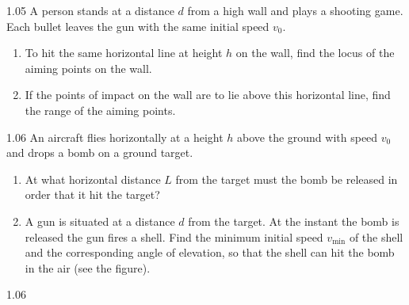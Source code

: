 \begin{problem}{1.05}
A person stands at a distance $d$ from a high wall and plays a shooting game. Each bullet leaves the gun with the same initial speed $v_0$.
\begin{enumerate}[label=(\arabic*),leftmargin=2.2em,itemsep=1pt,topsep=2pt]
\item To hit the same horizontal line at height $h$ on the wall, find the locus of the aiming points on the wall.
\item If the points of impact on the wall are to lie above this horizontal line, find the range of the aiming points.
\end{enumerate}
\end{problem}

\begin{problem}{1.06}
An aircraft flies horizontally at a height $h$ above the ground with speed $v_0$ and drops a bomb on a ground target.
\begin{enumerate}[label=(\arabic*),leftmargin=2.2em,itemsep=1pt,topsep=2pt]
\item At what horizontal distance $L$ from the target must the bomb be released in order that it hit the target?
\item A gun is situated at a distance $d$ from the target. At the instant the bomb is released the gun fires a shell. Find the minimum initial speed $v_{\min}$ of the shell and the corresponding angle of elevation, so that the shell can hit the bomb in the air (see the figure).
\end{enumerate}
\end{problem}

\begin{figbox}{1.06}
\end{figbox}

